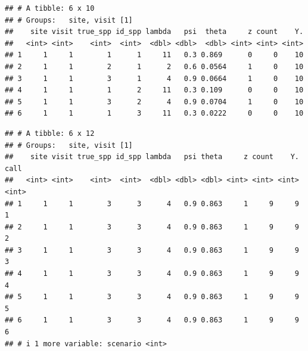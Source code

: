 \documentclass[
]{article}
\newenvironment{Shaded}{\begin{snugshade}}{\end{snugshade}}
\newcommand{\CommentTok}[1]{\textcolor[rgb]{0.56,0.35,0.01}{\textit{#1}}}
\newcommand{\DecValTok}[1]{\textcolor[rgb]{0.00,0.00,0.81}{#1}}
\newcommand{\FunctionTok}[1]{\textcolor[rgb]{0.13,0.29,0.53}{\textbf{#1}}}
\newcommand{\NormalTok}[1]{#1}
\newcommand{\OtherTok}[1]{\textcolor[rgb]{0.56,0.35,0.01}{#1}}
\newcommand{\SpecialCharTok}[1]{\textcolor[rgb]{0.81,0.36,0.00}{\textbf{#1}}}
\begin{document}
\linespread{1}

\linespread{1}

\begin{Shaded}
\end{Shaded}

\begin{verbatim}
## # A tibble: 6 x 10
## # Groups:   site, visit [1]
##    site visit true_spp id_spp lambda   psi  theta     z count    Y.
##   <int> <int>    <int>  <int>  <dbl> <dbl>  <dbl> <int> <int> <int>
## 1     1     1        1      1     11   0.3 0.869      0     0    10
## 2     1     1        2      1      2   0.6 0.0564     1     0    10
## 3     1     1        3      1      4   0.9 0.0664     1     0    10
## 4     1     1        1      2     11   0.3 0.109      0     0    10
## 5     1     1        3      2      4   0.9 0.0704     1     0    10
## 6     1     1        1      3     11   0.3 0.0222     0     0    10
\end{verbatim}

\linespread{1}

\linespread{1}

\begin{Shaded}
\end{Shaded}

\begin{verbatim}
## # A tibble: 6 x 12
## # Groups:   site, visit [1]
##    site visit true_spp id_spp lambda   psi theta     z count    Y.  call
##   <int> <int>    <int>  <int>  <dbl> <dbl> <dbl> <int> <int> <int> <int>
## 1     1     1        3      3      4   0.9 0.863     1     9     9     1
## 2     1     1        3      3      4   0.9 0.863     1     9     9     2
## 3     1     1        3      3      4   0.9 0.863     1     9     9     3
## 4     1     1        3      3      4   0.9 0.863     1     9     9     4
## 5     1     1        3      3      4   0.9 0.863     1     9     9     5
## 6     1     1        3      3      4   0.9 0.863     1     9     9     6
## # i 1 more variable: scenario <int>
\end{verbatim}
\end{document}
